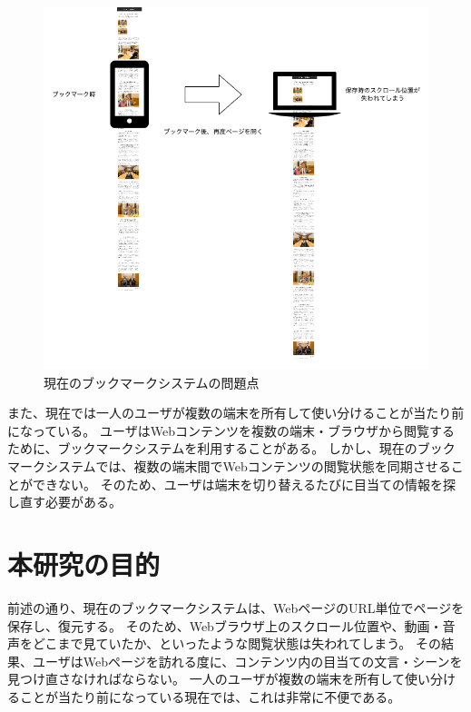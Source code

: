 \begin{figure}[htbp]
  \caption{現在のブックマークシステムの問題点}
  \label{fig:probrem-scroll-position}
  \begin{center}
    \includegraphics[bb=0 0 681 641,width=15cm]{img/010_introduction/probrem-scroll-position.pdf}
  \end{center}
\end{figure}

また、現在では一人のユーザが複数の端末を所有して使い分けることが当たり前になっている。
ユーザはWebコンテンツを複数の端末・ブラウザから閲覧するために、ブックマークシステムを利用することがある。
しかし、現在のブックマークシステムでは、複数の端末間でWebコンテンツの閲覧状態を同期させることができない。
そのため、ユーザは端末を切り替えるたびに目当ての情報を探し直す必要がある。


\section{本研究の目的}
前述の通り、現在のブックマークシステムは、WebページのURL単位でページを保存し、復元する。
そのため、Webブラウザ上のスクロール位置や、動画・音声をどこまで見ていたか、といったような閲覧状態は失われてしまう。
その結果、ユーザはWebページを訪れる度に、コンテンツ内の目当ての文言・シーンを見つけ直さなければならない。
一人のユーザが複数の端末を所有して使い分けることが当たり前になっている現在では、これは非常に不便である。

